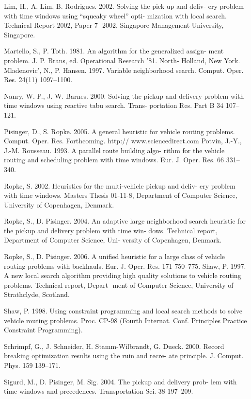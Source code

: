 \begin{thebibliography}{9}
	Lim, H., A. Lim, B. Rodrigues. 2002. Solving the pick up and deliv- ery problem with time windows using “squeaky wheel” opti- mization with local search. Technical Report 2002, Paper 7- 2002, Singapore Management University, Singapore.

	Martello, S., P. Toth. 1981. An algorithm for the generalized assign- ment problem. J. P. Brans, ed. Operational Research '81. North- Holland, New York.
	Mladenovic', N., P. Hansen. 1997. Variable neighborhood search. Comput. Oper. Res. 24(11) 1097–1100.

	Nanry, W. P., J. W. Barnes. 2000. Solving the pickup and delivery problem with time windows using reactive tabu search. Trans- portation Res. Part B 34 107–121.

	Pisinger, D., S. Ropke. 2005. A general heuristic for vehicle routing problems. Comput. Oper. Res. Forthcoming. http:// www.sciencedirect.com
	Potvin, J.-Y., J.-M. Rousseau. 1993. A parallel route building algo- rithm for the vehicle routing and scheduling problem with time windows. Eur. J. Oper. Res. 66 331–340.

	Ropke, S. 2002. Heuristics for the multi-vehicle pickup and deliv- ery problem with time windows. Masters Thesis 01-11-8, Department of Computer Science, University of Copenhagen, Denmark.

	Ropke, S., D. Pisinger. 2004. An adaptive large neighborhood search heuristic for the pickup and delivery problem with time win- dows. Technical report, Department of Computer Science, Uni- versity of Copenhagen, Denmark.

	Ropke, S., D. Pisinger. 2006. A unified heuristic for a large class of vehicle routing problems with backhauls. Eur. J. Oper. Res. 171 750–775.
	Shaw, P. 1997. A new local search algorithm providing high quality solutions to vehicle routing problems. Technical report, Depart- ment of Computer Science, University of Strathclyde, Scotland.

	Shaw, P. 1998. Using constraint programming and local search methods to solve vehicle routing problems. Proc. CP-98 (Fourth Internat. Conf. Principles Practice Constraint Programming).

	Schrimpf, G., J. Schneider, H. Stamm-Wilbrandt, G. Dueck. 2000. Record breaking optimization results using the ruin and recre- ate principle. J. Comput. Phys. 159 139–171.

	Sigurd, M., D. Pisinger, M. Sig. 2004. The pickup and delivery prob- lem with time windows and precedences. Transportation Sci. 38 197–209.


\end{thebibliography}
